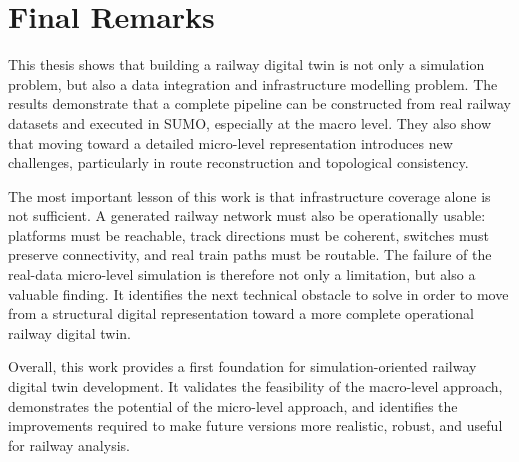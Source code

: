 \section{Final Remarks}
This thesis shows that building a railway digital twin is not only a simulation problem, but also a data integration and 
infrastructure modelling problem. The results demonstrate that a complete pipeline can be constructed from real railway 
datasets and executed in SUMO, especially at the macro level. They also show that moving toward a detailed micro-level 
representation introduces new challenges, particularly in route reconstruction and topological consistency.

The most important lesson of this work is that infrastructure coverage alone is not sufficient. A generated railway network 
must also be operationally usable: platforms must be reachable, track directions must be coherent, switches must preserve 
connectivity, and real train paths must be routable. The failure of the real-data micro-level simulation is therefore not 
only a limitation, but also a valuable finding. It identifies the next technical obstacle to solve in order to move from a 
structural digital representation toward a more complete operational railway digital twin.

Overall, this work provides a first foundation for simulation-oriented railway digital twin development. It validates the 
feasibility of the macro-level approach, demonstrates the potential of the micro-level approach, and identifies the 
improvements required to make future versions more realistic, robust, and useful for railway analysis.